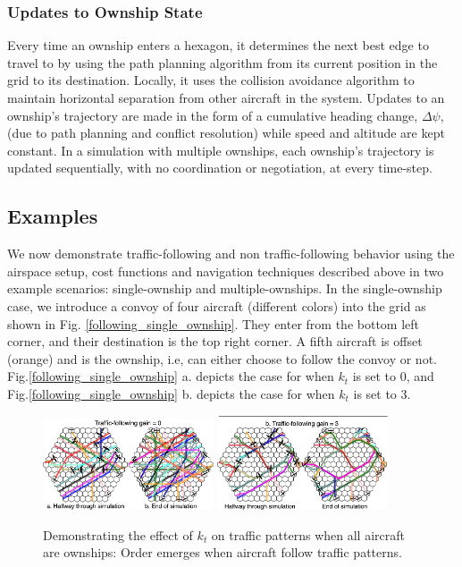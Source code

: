 \documentclass[conference, letter]{IEEEtran}
\begin{document}
\subsubsection*{Updates to Ownship State}
Every time an ownship enters a hexagon, it determines the next best edge to travel to by using the path planning algorithm from its current position in the grid to its destination. Locally, it uses the collision avoidance algorithm to maintain horizontal separation from other aircraft in the system. Updates to an ownship's trajectory are made in the form of a cumulative heading change, $\Delta\psi$, (due to path planning and conflict resolution) while speed and altitude are kept constant. In a simulation with multiple ownships, each ownship's trajectory is updated sequentially, with no coordination or negotiation, at every time-step\cite{b11}. 

\subsection*{Examples} 
\label{subsec:example}

We now demonstrate traffic-following and non traffic-following behavior using the airspace setup, cost functions and navigation techniques described above in two example scenarios: single-ownship and multiple-ownships. In the single-ownship case, we introduce a convoy of four aircraft (different colors) into the grid as shown in Fig. \ref{following_single_ownship}. They enter from the bottom left corner, and their destination is the top right corner. A fifth aircraft is offset (orange) and is the ownship, i.e, can either choose to follow the convoy or not. Fig.\ref{following_single_ownship} a. depicts the case for when $k_t$ is set to 0, and Fig.\ref{following_single_ownship} b. depicts the case for when $k_t$ is set to 3. 
\begin{figure}[hbt!]
\centering
\includegraphics[width=0.45\textwidth]{results1.jpg}
\includegraphics[width=0.45\textwidth]{results2.jpg}
\caption{
Demonstrating the effect of $k_t$ on traffic patterns when all aircraft are ownships: Order emerges when aircraft follow traffic patterns.}
\label{results1_1}
\end{figure}
\end{document}
